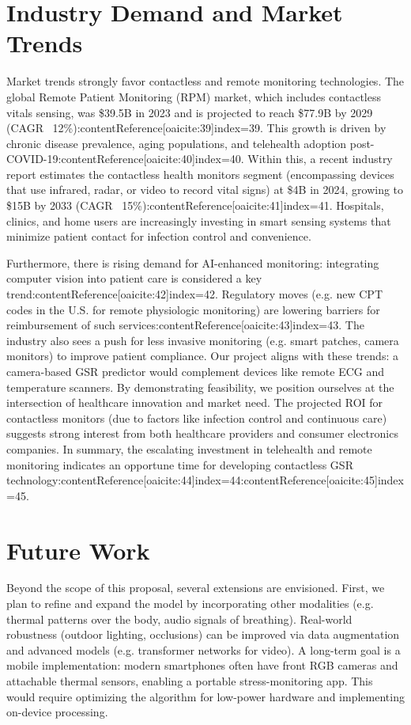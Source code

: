 \documentclass[12pt]{article}
\begin{document}
    \section{Industry Demand and Market Trends}
    Market trends strongly favor contactless and remote monitoring technologies. The global Remote Patient Monitoring (RPM) market, which includes contactless vitals sensing, was \$39.5B in 2023 and is projected to reach \$77.9B by 2029 (CAGR ~12\%):contentReference[oaicite:39]{index=39}. This growth is driven by chronic disease prevalence, aging populations, and telehealth adoption post-COVID-19:contentReference[oaicite:40]{index=40}. Within this, a recent industry report estimates the contactless health monitors segment (encompassing devices that use infrared, radar, or video to record vital signs) at \$4B in 2024, growing to \$15B by 2033 (CAGR ~15\%):contentReference[oaicite:41]{index=41}. Hospitals, clinics, and home users are increasingly investing in smart sensing systems that minimize patient contact for infection control and convenience.

    Furthermore, there is rising demand for AI-enhanced monitoring: integrating computer vision into patient care is considered a key trend:contentReference[oaicite:42]{index=42}. Regulatory moves (e.g. new CPT codes in the U.S. for remote physiologic monitoring) are lowering barriers for reimbursement of such services:contentReference[oaicite:43]{index=43}. The industry also sees a push for less invasive monitoring (e.g. smart patches, camera monitors) to improve patient compliance. Our project aligns with these trends: a camera-based GSR predictor would complement devices like remote ECG and temperature scanners. By demonstrating feasibility, we position ourselves at the intersection of healthcare innovation and market need. The projected ROI for contactless monitors (due to factors like infection control and continuous care) suggests strong interest from both healthcare providers and consumer electronics companies. In summary, the escalating investment in telehealth and remote monitoring indicates an opportune time for developing contactless GSR technology:contentReference[oaicite:44]{index=44}:contentReference[oaicite:45]{index=45}.


    \section{Future Work}
    Beyond the scope of this proposal, several extensions are envisioned. First, we plan to refine and expand the model by incorporating other modalities (e.g. thermal patterns over the body, audio signals of breathing). Real-world robustness (outdoor lighting, occlusions) can be improved via data augmentation and advanced models (e.g. transformer networks for video). A long-term goal is a mobile implementation: modern smartphones often have front RGB cameras and attachable thermal sensors, enabling a portable stress-monitoring app. This would require optimizing the algorithm for low-power hardware and implementing on-device processing.
\end{document}
